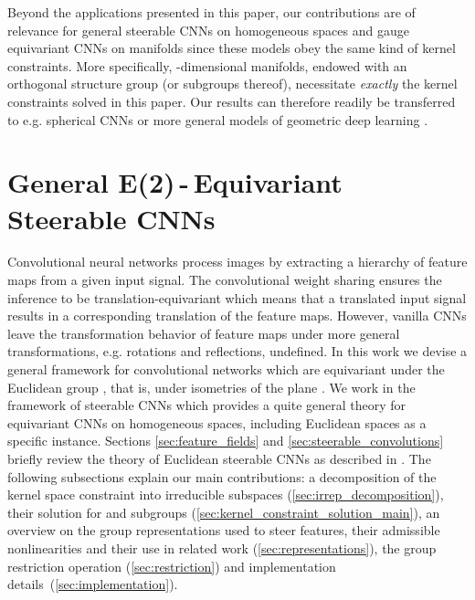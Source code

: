 \documentclass{article}
\newlength{\secBefore}
\newlength{\secAfter}
\begin{document}
Beyond the applications presented in this paper, our contributions are of relevance for general steerable CNNs on homogeneous spaces \cite{Cohen2018-IIR,generaltheory} and gauge equivariant CNNs on manifolds \cite{gauge} since these models obey the same kind of kernel constraints.
More specifically, -dimensional manifolds, endowed with an orthogonal structure group  (or subgroups thereof), necessitate \emph{exactly} the kernel constraints solved in this paper.
Our results can therefore readily be transferred to e.g. spherical CNNs 
\cite{Cohen2018-S2CNN,gauge,kondorClebschGordanNets2018,estevesLearningEquivariantRepresentations2018,perraudinDeepSphereEfficientSpherical2018,jiang2019spherical}
or more general models of geometric deep learning
\cite{poulenardMultidirectionalGeodesicNeural2018a,masciGeodesicConvolutionalNeural2015,brunaSpectralNetworksDeep,boscainiLearningClassSpecific2015}.


 	

\vspace*{\secBefore}
\section{General E(2)\,-\,Equivariant Steerable CNNs}
\label{sec:e2cnns}
\vspace*{\secAfter}

Convolutional neural networks process images by extracting a hierarchy of feature maps from a given input signal.
The convolutional weight sharing ensures the inference to be translation-equivariant which means that a translated input signal results in a corresponding translation of the feature maps.
However, vanilla CNNs leave the transformation behavior of feature maps under more general transformations, e.g. rotations and reflections, undefined.
In this work we devise a general framework for convolutional networks which are equivariant under the Euclidean group , that is, under isometries of the plane .
We work in the framework of steerable CNNs
\cite{Cohen2017-STEER,3d_steerableCNNs,Cohen2018-IIR,generaltheory,gauge} 
which provides a quite general theory for equivariant CNNs on homogeneous spaces, including Euclidean spaces  as a specific instance.
Sections \ref{sec:feature_fields} and \ref{sec:steerable_convolutions} briefly review the theory of Euclidean steerable CNNs
as described in \cite{3d_steerableCNNs}.
The following subsections explain our main contributions:
a decomposition of the kernel space constraint into irreducible subspaces (\ref{sec:irrep_decomposition}),
their solution for  and subgroups (\ref{sec:kernel_constraint_solution_main}),
an overview on the group representations used to steer features, their admissible nonlinearities and their use in related work (\ref{sec:representations}),
the group restriction operation (\ref{sec:restriction})
and implementation details~(\ref{sec:implementation}). 	
\end{document}
